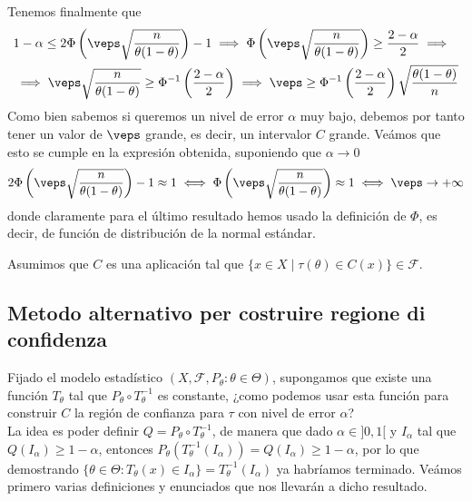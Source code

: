 Tenemos finalmente que
\begin{align*}
    & 1-\alpha \leq 2 \Phi\left( \veps \sqrt{\dfrac{n}{\theta(1-\theta)}}\right) - 1 \implies \Phi\left( \veps \sqrt{\dfrac{n}{\theta(1-\theta)}}\right) \geq \dfrac{2-\alpha}{2} \implies \\
    & \implies \veps \sqrt{\dfrac{n}{\theta(1-\theta)}} \geq \Phi^{-1}\left(\dfrac{2-\alpha}{2}\right) \implies \veps \geq \Phi^{-1}\left(\dfrac{2-\alpha}{2}\right) \sqrt{\dfrac{\theta(1-\theta)}{n}}
\end{align*}
Como bien sabemos si queremos un nivel de error $\alpha$ muy bajo, debemos por tanto tener un valor de $\veps$ grande, es decir, un intervalor $C$ grande. Veámos que esto se cumple en la expresión obtenida, suponiendo que $\alpha \to 0$
\begin{equation*}
    2\Phi\left(\veps \sqrt{\dfrac{n}{\theta(1-\theta)}}\right) - 1 \approx 1 \iff \Phi\left(\veps \sqrt{\dfrac{n}{\theta(1-\theta)}}\right) \approx 1 \iff \veps \to +\infty
\end{equation*}
donde claramente para el último resultado hemos usado la definición de $\Phi$, es decir, de función de distribución de la normal estándar.

\begin{observacion}
    Asumimos que $C$ es una aplicación tal que $\{x\in X\mid \tau(\theta) \in C(x)\}\in \mathcal{F}$.
\end{observacion}

\subsection{Metodo alternativo per costruire regione di confidenza}

\noindent
Fijado el modelo estadístico $(X, \mathcal{F}, P_{\theta}: \theta \in \Theta)$, supongamos que existe una función $T_{\theta}$ tal que $P_{\theta}\circ T_{\theta}^{-1}$ es constante, ¿como podemos usar esta función para construir $C$ la región de confianza para $\tau$ con nivel de error $\alpha$? \\
\noindent
La idea es poder definir $Q=P_{\theta}\circ T_{\theta}^{-1}$, de manera que dado $\alpha\in ]0,1[$ y $I_{\alpha}$ tal que $Q(I_{\alpha}) \geq 1-\alpha$, entonces $P_{\theta}(T_{\theta}^{-1}(I_{\alpha})) = Q(I_{\alpha}) \geq 1-\alpha$, por lo que demostrando \mbox{$\{\theta \in \Theta : T_{\theta}(x) \in I_{\alpha}\}=T_{\theta}^{-1}(I_{\alpha})$} ya habríamos terminado. Veámos primero varias definiciones y enunciados que nos llevarán a dicho resultado. \\

